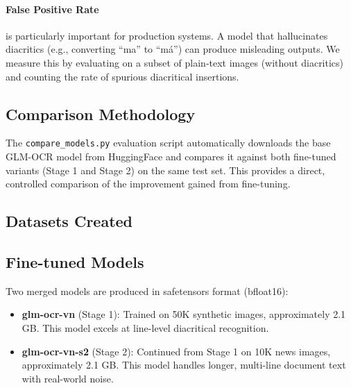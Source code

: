 \documentclass[11pt]{article}
\begin{document}
\paragraph{False Positive Rate} is particularly important for production systems. 
A model that hallucinates diacritics (e.g., converting ``ma'' to ``má'') can produce misleading outputs. 
We measure this by evaluating on a subset of plain-text images (without diacritics) and counting the rate of spurious diacritical insertions.

\subsection{Comparison Methodology}

The \texttt{compare\_models.py} evaluation script automatically downloads the base GLM-OCR model from HuggingFace and compares it against both fine-tuned variants (Stage 1 and Stage 2) on the same test set. 
This provides a direct, controlled comparison of the improvement gained from fine-tuning.

\subsection{Datasets Created}

\begin{table}[t]
\centering
\small
{}
\caption{Generated training datasets.}
\label{tab:datasets}
\end{table}

\subsection{Fine-tuned Models}

Two merged models are produced in safetensors format (bfloat16):

\begin{itemize}[nosep,leftmargin=*]
    \item \textbf{glm-ocr-vn} (Stage 1): Trained on 50K synthetic images, approximately 2.1 GB. This model excels at line-level diacritical recognition.
    \item \textbf{glm-ocr-vn-s2} (Stage 2): Continued from Stage 1 on 10K news images, approximately 2.1 GB. This model handles longer, multi-line document text with real-world noise.
\end{itemize}
\end{document}
